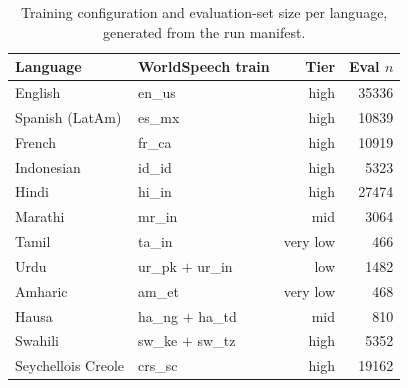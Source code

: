 \begin{table}[t]
\centering
\setlength{\tabcolsep}{4pt}
\begin{tabular}{@{}llrr@{}}
\toprule
\textbf{Language} & \textbf{WorldSpeech train} & \textbf{Tier} & \textbf{Eval $n$} \\
\midrule
English & en\_us & high & 35336 \\
Spanish (LatAm) & es\_mx & high & 10839 \\
French & fr\_ca & high & 10919 \\
Indonesian & id\_id & high & 5323 \\
\midrule
Hindi & hi\_in & high & 27474 \\
Marathi & mr\_in & mid & 3064 \\
Tamil & ta\_in & very low & 466 \\
Urdu & ur\_pk $+$ ur\_in & low & 1482 \\
\midrule
Amharic & am\_et & very low & 468 \\
Hausa & ha\_ng $+$ ha\_td & mid & 810 \\
Swahili & sw\_ke $+$ sw\_tz & high & 5352 \\
\midrule
Seychellois Creole & crs\_sc & high & 19162 \\
\bottomrule
\end{tabular}
\caption{Training configuration and evaluation-set size per language, generated from the run manifest.}
\label{tab:dataset-generated}
\end{table}
